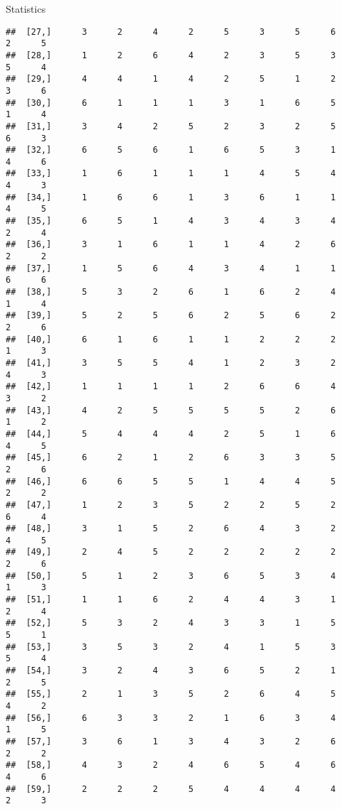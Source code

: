 \documentclass[
  ignorenonframetext,
]{beamer}
\begin{document}
\begin{frame}[fragile]{Statistics}
\begin{verbatim}
##  [27,]      3      2      4      2      5      3      5      6      2      5
##  [28,]      1      2      6      4      2      3      5      3      5      4
##  [29,]      4      4      1      4      2      5      1      2      3      6
##  [30,]      6      1      1      1      3      1      6      5      1      4
##  [31,]      3      4      2      5      2      3      2      5      6      3
##  [32,]      6      5      6      1      6      5      3      1      4      6
##  [33,]      1      6      1      1      1      4      5      4      4      3
##  [34,]      1      6      6      1      3      6      1      1      4      5
##  [35,]      6      5      1      4      3      4      3      4      2      4
##  [36,]      3      1      6      1      1      4      2      6      2      2
##  [37,]      1      5      6      4      3      4      1      1      6      6
##  [38,]      5      3      2      6      1      6      2      4      1      4
##  [39,]      5      2      5      6      2      5      6      2      2      6
##  [40,]      6      1      6      1      1      2      2      2      1      3
##  [41,]      3      5      5      4      1      2      3      2      4      3
##  [42,]      1      1      1      1      2      6      6      4      3      2
##  [43,]      4      2      5      5      5      5      2      6      1      2
##  [44,]      5      4      4      4      2      5      1      6      4      5
##  [45,]      6      2      1      2      6      3      3      5      2      6
##  [46,]      6      6      5      5      1      4      4      5      2      2
##  [47,]      1      2      3      5      2      2      5      2      6      4
##  [48,]      3      1      5      2      6      4      3      2      4      5
##  [49,]      2      4      5      2      2      2      2      2      2      6
##  [50,]      5      1      2      3      6      5      3      4      1      3
##  [51,]      1      1      6      2      4      4      3      1      2      4
##  [52,]      5      3      2      4      3      3      1      5      5      1
##  [53,]      3      5      3      2      4      1      5      3      5      4
##  [54,]      3      2      4      3      6      5      2      1      2      5
##  [55,]      2      1      3      5      2      6      4      5      4      2
##  [56,]      6      3      3      2      1      6      3      4      1      5
##  [57,]      3      6      1      3      4      3      2      6      2      2
##  [58,]      4      3      2      4      6      5      4      6      4      6
##  [59,]      2      2      2      5      4      4      4      4      2      3

\end{verbatim}
\end{frame}
\end{document}
